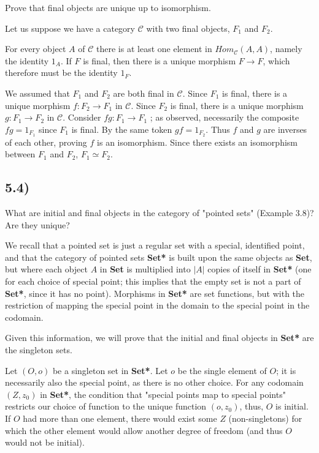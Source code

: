\documentclass[12pt, letterpaper, twoside]{report}
\begin{document}
Prove that final objects are unique up to isomorphism.

Let us suppose we have a category $\mathcal{C}$ with two final objects, $F_1$ and $F_2$.

For every object $A$ of $\mathcal{C}$ there is at least one element in $Hom_{\mathcal{C}} (A, A)$, namely the identity $1_A$. If $F$ is final, then there is a unique morphism $F \to F$, which therefore must be the identity $1_F$.

We assumed that $F_1$ and $F_2$ are both final in $\mathcal{C}$. Since $F_1$ is final, there is a unique morphism $f : F_2 \to F_1$ in $\mathcal{C}$. Since $F_2$ is final, there is a unique morphism $g : F_1 \to F_2$ in $\mathcal{C}$. Consider $fg : F_1 \to F_1$ ; as observed, necessarily the composite $fg = 1_{F_1}$
since $F_1$ is final. By the same token $gf = 1_{F_2}$. Thus $f$ and $g$ are inverses of each other, proving $f$ is an isomorphism. Since there exists an isomorphism between $F_1$ and $F_2$, $F_1 \simeq F_2$.



\subsection*{5.4)}

What are initial and final objects in the category of "pointed sets" (Example 3.8)? Are they unique?

We recall that a pointed set is just a regular set with a special, identified point, and that the category of pointed sets \textbf{Set*} is built upon the same objects as \textbf{Set}, but where each object $A$ in \textbf{Set} is multiplied into $|A|$ copies of itself in \textbf{Set*} (one for each choice of special point; this implies that the empty set is not a part of \textbf{Set*}, since it has no point). Morphisms in \textbf{Set*} are set functions, but with the restriction of mapping the special point in the domain to the special point in the codomain.

Given this information, we will prove that the initial and final objects in \textbf{Set*} are the singleton sets.

Let $(O, o)$ be a singleton set in \textbf{Set*}. Let $o$ be the single element of $O$; it is necessarily also the special point, as there is no other choice. For any codomain $(Z, z_0)$ in \textbf{Set*}, the condition that "special points map to special points" restricts our choice of function to the unique function ${(o, z_0)}$, thus, $O$ is initial. If $O$ had more than one element, there would exist some $Z$ (non-singletons) for which the other element would allow another degree of freedom (and thus $O$ would not be initial).
\end{document}
